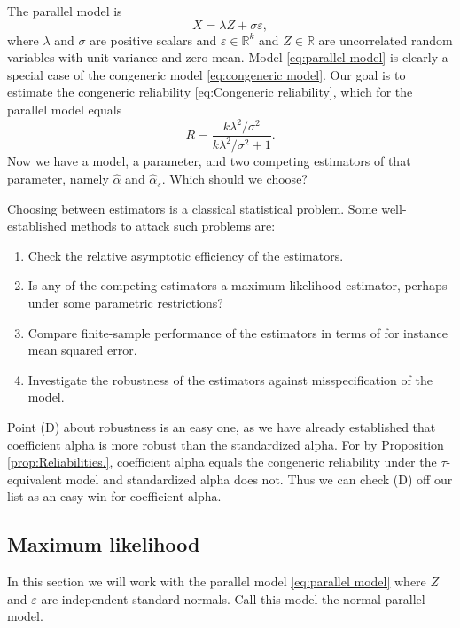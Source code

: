 \documentclass[twoside]{article}
\DeclareMathOperator{\Cor}{Cor}
\renewcommand{\sqrt}[1]{{(#1)^{1/2}}}
\begin{document}
The parallel model is
\begin{equation}
\label{eq:parallel model}
X = \lambda Z + \sigma\varepsilon,
\end{equation}
where $\lambda$ and $\sigma$ are positive scalars and $\varepsilon\in\mathbb{R}^k$ and $Z\in\mathbb{R}$ are uncorrelated random variables with unit variance and zero mean. Model \eqref{eq:parallel model} is clearly a special case of the congeneric model \eqref{eq:congeneric model}. Our goal is to estimate the congeneric reliability \eqref{eq:Congeneric reliability}, which for the parallel model equals
\begin{equation}
\label{eq:parallel_omega}
 R = \frac{k\lambda^2/\sigma^2}{k\lambda^2/\sigma^2 + 1}.
\end{equation}
Now we have a model, a parameter, and two competing estimators of that parameter, namely $\hat{\alpha}$ and $\hat{\alpha}_s$. Which should we choose? 

Choosing between estimators is a classical statistical problem. Some well-established methods to attack such problems are:


\begin{enumerate}[label=(\Alph*)]
\item Check the relative asymptotic efficiency of the estimators.
\item Is any of the competing estimators a maximum likelihood estimator, perhaps under some parametric restrictions?
\item Compare finite-sample performance of the estimators in terms of for instance mean squared error.
\item Investigate the robustness of the estimators against misspecification of the model.
\end{enumerate}

Point (D) about robustness is an easy one, as we have already established that coefficient alpha is more robust than the standardized alpha. For by Proposition \ref{prop:Reliabilities.}, coefficient alpha equals the congeneric reliability under the $\tau$-equivalent model and standardized alpha does not. Thus we can check (D) off our list as an easy win for coefficient alpha.

\subsection{Maximum likelihood}
In this section we will work with the parallel model \eqref{eq:parallel model} where $Z$ and $\varepsilon$ are independent standard normals. Call this model the normal parallel model.
\end{document}
